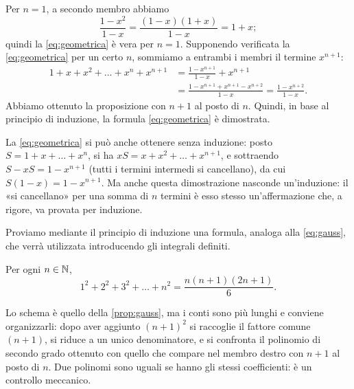 \begin{dimostrazione}
Per $n=1$, a secondo membro abbiamo
\[
  \frac{1-x^{2}}{1-x}=\frac{(1-x)(1+x)}{1-x}=1+x;
\]
quindi la \eqref{eq:geometrica} è vera per $n=1$. Supponendo verificata la
\eqref{eq:geometrica} per un certo $n$, sommiamo a entrambi i membri il termine
$x^{n+1}$:
\begin{equation}\label{eq:geometrica-passo}
\begin{split}
  1+x+x^{2}+\dots+x^{n}+x^{n+1}&=\frac{1-x^{n+1}}{1-x}+x^{n+1}\\
  &=\frac{1-x^{n+1}+x^{n+1}-x^{n+2}}{1-x}=\frac{1-x^{n+2}}{1-x}.
\end{split}
\end{equation}
Abbiamo ottenuto la proposizione con $n+1$ al posto di $n$. Quindi, in base al
principio di induzione, la formula \eqref{eq:geometrica} è dimostrata.
\end{dimostrazione}

\begin{osservazione}
La \eqref{eq:geometrica} si può anche ottenere senza induzione: posto
$S=1+x+\dots+x^{n}$, si ha $xS=x+x^{2}+\dots+x^{n+1}$, e sottraendo
$S-xS=1-x^{n+1}$ (tutti i termini intermedi si cancellano), da cui $S(1-x)=1-x^{n+1}$.
Ma anche questa dimostrazione nasconde un'induzione: il «si cancellano» per una somma
di $n$ termini è esso stesso un'affermazione che, a rigore, va provata per induzione.
\end{osservazione}

Proviamo mediante il principio di induzione una formula, analoga alla \eqref{eq:gauss},
che verrà utilizzata introducendo gli integrali definiti.

\begin{proposizione}\label{prop:quadrati}
Per ogni $n\in\mathbb{N}$,
\begin{equation}\label{eq:quadrati}
  1^{2}+2^{2}+3^{2}+\dots+n^{2}=\frac{n(n+1)(2n+1)}{6}.
\end{equation}
\end{proposizione}

\begin{schema}
\end{schema}

\begin{strategia}
Lo schema è quello della \cref{prop:gauss}, ma i conti sono più lunghi e conviene
organizzarli: dopo aver aggiunto $(n+1)^{2}$ si raccoglie il fattore comune $(n+1)$, si
riduce a un unico denominatore, e si confronta il polinomio di secondo grado ottenuto
con quello che compare nel membro destro con $n+1$ al posto di $n$. Due polinomi sono
uguali se hanno gli stessi coefficienti: è un controllo meccanico.
\end{strategia}

